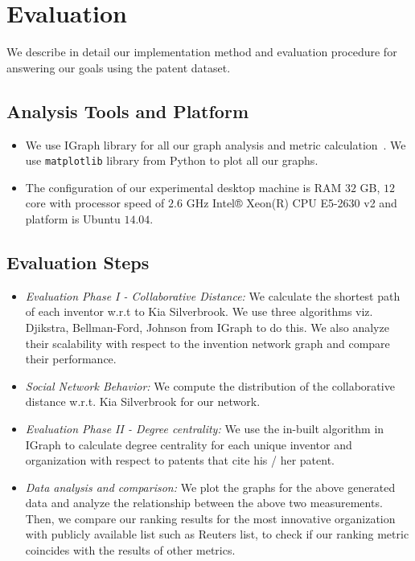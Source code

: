\section{Evaluation}
\label{sec:eval}


We describe in detail our implementation method and evaluation procedure for
answering  our goals using the patent dataset. 

\subsection{Analysis Tools and Platform}


	\begin{itemize}
		\item We use IGraph library for all our graph analysis and metric
		calculation~\cite{igraph}. We use \texttt{matplotlib} library from Python to plot all our graphs.
		
		\item The configuration of our experimental desktop machine is RAM $32$ GB, $12$
		core with processor speed of $2.6$ GHz Intel® Xeon(R) CPU E5-2630 v2 and platform is Ubuntu $14.04$.
	\end{itemize}



\subsection{Evaluation Steps}
	\begin{itemize}
		\item {\em Evaluation Phase I - Collaborative Distance:} We calculate the 
		shortest path of each inventor w.r.t to Kia Silverbrook. We use three
		algorithms viz. Djikstra, Bellman-Ford, Johnson from IGraph to do this. We
		also analyze their scalability with respect to the invention network graph
		and compare their performance.
		\item {\em Social Network Behavior:} We compute the distribution of the 
		collaborative distance w.r.t. Kia Silverbrook for our network.
		\item {\em Evaluation Phase II - Degree centrality:} We use the in-built
		algorithm in IGraph to calculate degree centrality
		for each unique inventor and organization with respect to patents that cite his / her patent.
		\item {\em Data analysis and comparison:} We plot the graphs for the above
		generated data and analyze the relationship between the above two
		measurements. Then, we compare our ranking results for the most innovative organization
		with publicly available list such as Reuters list, to check if our ranking
		metric coincides with the results of other metrics.
	\end{itemize}



